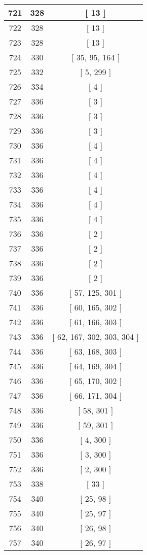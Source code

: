 \begin{center}
\begin{longtable}[H]{|| c c c ||}
721 & 328 & [ 13 ]
\\\hline
722 & 328 & [ 13 ]
\\\hline
723 & 328 & [ 13 ]
\\\hline
724 & 330 & [ 35, 95, 164 ]
\\\hline
725 & 332 & [ 5, 299 ]
\\\hline
726 & 334 & [ 4 ]
\\\hline
727 & 336 & [ 3 ]
\\\hline
728 & 336 & [ 3 ]
\\\hline
729 & 336 & [ 3 ]
\\\hline
730 & 336 & [ 4 ]
\\\hline
731 & 336 & [ 4 ]
\\\hline
732 & 336 & [ 4 ]
\\\hline
733 & 336 & [ 4 ]
\\\hline
734 & 336 & [ 4 ]
\\\hline
735 & 336 & [ 4 ]
\\\hline
736 & 336 & [ 2 ]
\\\hline
737 & 336 & [ 2 ]
\\\hline
738 & 336 & [ 2 ]
\\\hline
739 & 336 & [ 2 ]
\\\hline
740 & 336 & [ 57, 125, 301 ]
\\\hline
741 & 336 & [ 60, 165, 302 ]
\\\hline
742 & 336 & [ 61, 166, 303 ]
\\\hline
743 & 336 & [ 62, 167, 302, 303, 304 ]
\\\hline
744 & 336 & [ 63, 168, 303 ]
\\\hline
745 & 336 & [ 64, 169, 304 ]
\\\hline
746 & 336 & [ 65, 170, 302 ]
\\\hline
747 & 336 & [ 66, 171, 304 ]
\\\hline
748 & 336 & [ 58, 301 ]
\\\hline
749 & 336 & [ 59, 301 ]
\\\hline
750 & 336 & [ 4, 300 ]
\\\hline
751 & 336 & [ 3, 300 ]
\\\hline
752 & 336 & [ 2, 300 ]
\\\hline
753 & 338 & [ 33 ]
\\\hline
754 & 340 & [ 25, 98 ]
\\\hline
755 & 340 & [ 25, 97 ]
\\\hline
756 & 340 & [ 26, 98 ]
\\\hline
757 & 340 & [ 26, 97 ]
\\\hline

\end{longtable}
\end{center}
